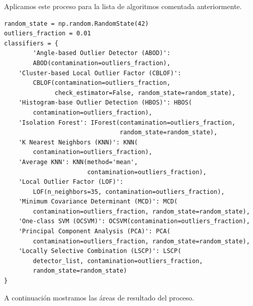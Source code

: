 \documentclass[12pt,twoside]{report}
\begin{document}
Aplicamos este proceso para la lista de algoritmos comentada anteriormente.

\begin{lstlisting}
random_state = np.random.RandomState(42)
outliers_fraction = 0.01
classifiers = {
        'Angle-based Outlier Detector (ABOD)':
        ABOD(contamination=outliers_fraction),
    'Cluster-based Local Outlier Factor (CBLOF)':
        CBLOF(contamination=outliers_fraction,
              check_estimator=False, random_state=random_state),
    'Histogram-base Outlier Detection (HBOS)': HBOS(
        contamination=outliers_fraction),
    'Isolation Forest': IForest(contamination=outliers_fraction,
                                random_state=random_state),
    'K Nearest Neighbors (KNN)': KNN(
        contamination=outliers_fraction),
    'Average KNN': KNN(method='mean',
                       contamination=outliers_fraction),
    'Local Outlier Factor (LOF)':
        LOF(n_neighbors=35, contamination=outliers_fraction),
    'Minimum Covariance Determinant (MCD)': MCD(
        contamination=outliers_fraction, random_state=random_state),
    'One-class SVM (OCSVM)': OCSVM(contamination=outliers_fraction),
    'Principal Component Analysis (PCA)': PCA(
        contamination=outliers_fraction, random_state=random_state),
    'Locally Selective Combination (LSCP)': LSCP(
        detector_list, contamination=outliers_fraction,
        random_state=random_state)
}
\end{lstlisting}

A continuación mostramos las áreas de resultado del proceso.
\end{document}
